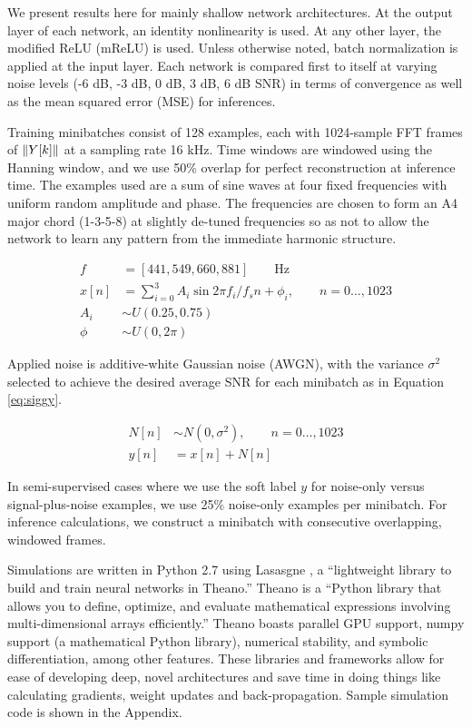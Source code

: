We present results here for mainly shallow network architectures. At the output layer of each network, an identity nonlinearity is used. At any other layer, the modified ReLU (mReLU) is used. Unless otherwise noted, batch normalization is applied at the input layer. Each network is compared first to itself at varying noise levels (-6 dB, -3 dB, 0 dB, 3 dB, 6 dB SNR) in terms of convergence as well as the mean squared error (MSE) for inferences.

Training minibatches consist of 128 examples, each with 1024-sample FFT frames of $\lVert Y[k]\rVert$ at a sampling rate 16 kHz. Time windows are windowed using the Hanning window, and we use 50\% overlap for perfect reconstruction at inference time. The examples used are a sum of sine waves at four fixed frequencies with uniform random amplitude and phase. The frequencies are chosen to form an A4 major chord (1-3-5-8) at slightly de-tuned frequencies so as not to allow the network to learn any pattern from the immediate harmonic structure.

\begin{align}
f &= [441, 549, 660, 881]\qquad \text{Hz}\\
x[n] &= \sum_{i=0}^{3} A_i \sin{2 \pi f_i / f_s n + \phi_i}, \qquad n=0\ldots ,1023\\
A_i &\sim U(0.25, 0.75)\\
\phi &\sim U(0, 2\pi)
\end{align}

Applied noise is additive-white Gaussian noise (AWGN), with the variance $\sigma^2$ selected to achieve the desired average SNR for each minibatch as in Equation \ref{eq:siggy}.

\begin{align}
N[n] &\sim N(0, \sigma^2), \qquad n=0\ldots ,1023\\
y[n] &= x[n] + N[n]
\end{align}

In semi-supervised cases where we use the soft label $y$ for noise-only versus signal-plus-noise examples, we use 25\% noise-only examples per minibatch. For inference calculations, we construct a minibatch with consecutive overlapping, windowed frames.

Simulations are written in Python 2.7 using Lasasgne \cite{sander_dieleman_2015_27878}, a ``lightweight library to build and train neural networks in Theano.'' Theano is a ``Python library that allows you to define, optimize, and evaluate mathematical expressions involving multi-dimensional arrays efficiently.'' \cite{2016arXiv160502688short} Theano boasts parallel GPU support, numpy support (a mathematical Python library), numerical stability, and symbolic differentiation, among other features. These libraries and frameworks allow for ease of developing deep, novel architectures and save time in doing things like calculating gradients, weight updates and back-propagation. Sample simulation code is shown in the Appendix.

